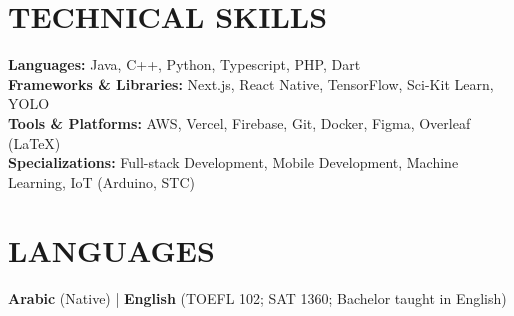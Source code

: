 \documentclass[11pt,a4paper]{article}
\begin{document}
\section*{TECHNICAL SKILLS}
\textbf{Languages:} Java, C++, Python, Typescript, PHP, Dart \\[4pt]
\textbf{Frameworks \& Libraries:} Next.js, React Native, TensorFlow, Sci-Kit Learn, YOLO \\[4pt]
\textbf{Tools \& Platforms:} AWS, Vercel, Firebase, Git, Docker, Figma, Overleaf (LaTeX) \\[4pt]
\textbf{Specializations:} Full-stack Development, Mobile Development, Machine Learning, IoT (Arduino, STC)

\section*{LANGUAGES}
\textbf{Arabic} (Native) \quad | \quad \textbf{English} (TOEFL 102; SAT 1360; Bachelor taught in English)
\end{document}
